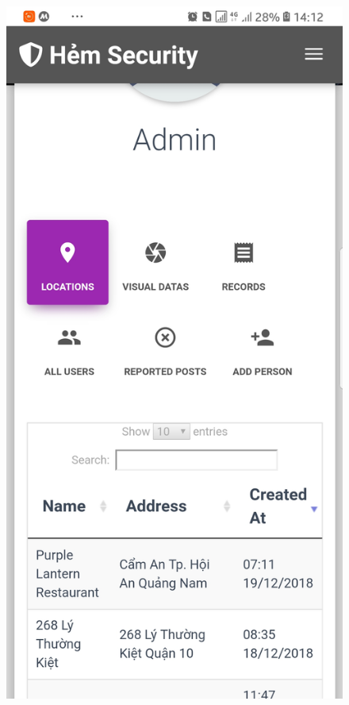 \begin{figure}[!htb]
  \includegraphics[width=\linewidth]{images/chap4/admin_mb.jpg}
\endminipage\hfill
{}

\end{figure}
